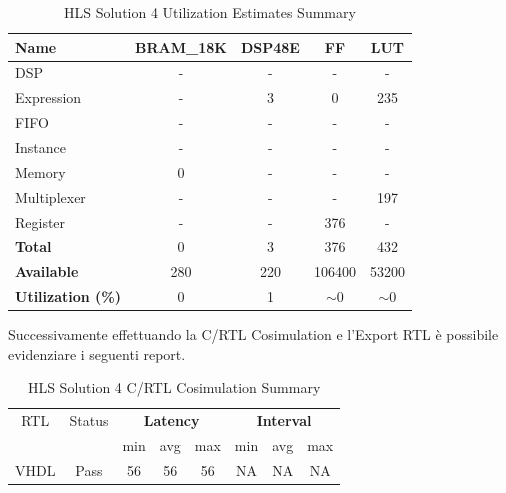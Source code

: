 \begin{table}[h]
	\centering
	\begin{tabular}{|l|c|c|c|c|}
		\hline
		\textbf{Name}    & \textbf{BRAM\_18K} & \textbf{DSP48E} & \textbf{FF} & \textbf{LUT} \\ \hline
		DSP              & -                   & -               & -           & -            \\ 
		Expression       & -                   & 3               & 0           & 235          \\ 
		FIFO             & -                   & -               & -           & -            \\ 
		Instance         & -                   & -               & -           & -            \\ 
		Memory           & 0                   & -               & -          & -            \\ 
		Multiplexer      & -                   & -               & -           & 197          \\ 
		Register         & -                   & -               & 376         & -            \\ \hline
		\textbf{Total}   & 0                   & 3               & 376         & 432          \\ \hline
		\textbf{Available} & 280               & 220             & 106400      & 53200        \\ \hline
		\textbf{Utilization (\%)} & 0            & 1               & $\sim$0     & $\sim$0      \\ \hline
	\end{tabular}
	\caption{HLS Solution 4 Utilization Estimates Summary}
	\label{tab:hls-solution-4-utilization-estimates-summary}
\end{table}

Successivamente effettuando la C/RTL Cosimulation e l'Export RTL è possibile evidenziare i seguenti report.

\begin{table}[H]
	\centering
	\begin{tabular}{|c|c|c|c|c|c|c|c|}
		\hline
		\multicolumn{1}{|c|}{RTL} & \multicolumn{1}{|c|}{Status} & \multicolumn{3}{c|}{\textbf{Latency}} & \multicolumn{3}{c|}{\textbf{Interval}} \\
		&  & min & avg & max & min & avg & max \\
		\hline
		VHDL & Pass & 56 & 56 & 56 & NA & NA & NA \\
		\hline
	\end{tabular}
	\caption{HLS Solution 4 C/RTL Cosimulation Summary }
	\label{tab:hls-solution-4-cosimulation-summary}
\end{table}

